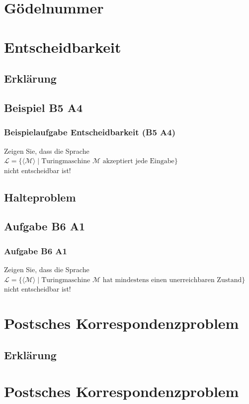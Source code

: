 


\section{Gödelnummer}

\section{Entscheidbarkeit}
\subsection{Erklärung}
\subsection{Beispiel B5 A4}
\begin{frame}
	\frametitle{Beispielaufgabe Entscheidbarkeit (B5 A4)}
	Zeigen Sie, dass die Sprache \\ $\mathcal{L} = \{ \langle \mathcal{M} \rangle \; | \; \mbox{Turingmaschine $\mathcal{M}$ akzeptiert jede Eingabe} \}$ \\ nicht entscheidbar ist!
\end{frame}
\subsection{Halteproblem}
\subsection{Aufgabe B6 A1}
\begin{frame}
	\frametitle{Aufgabe B6 A1}
	Zeigen Sie, dass die Sprache \\ $\mathcal{L} = \{\langle\mathcal{M}\rangle \; | \; \mbox{Turingmaschine $\mathcal{M}$ hat mindestens einen unerreichbaren Zustand}\}$ \\ nicht entscheidbar ist!
\end{frame}

\section{Postsches Korrespondenzproblem}
\subsection{Erklärung}
\section{Postsches Korrespondenzproblem}
